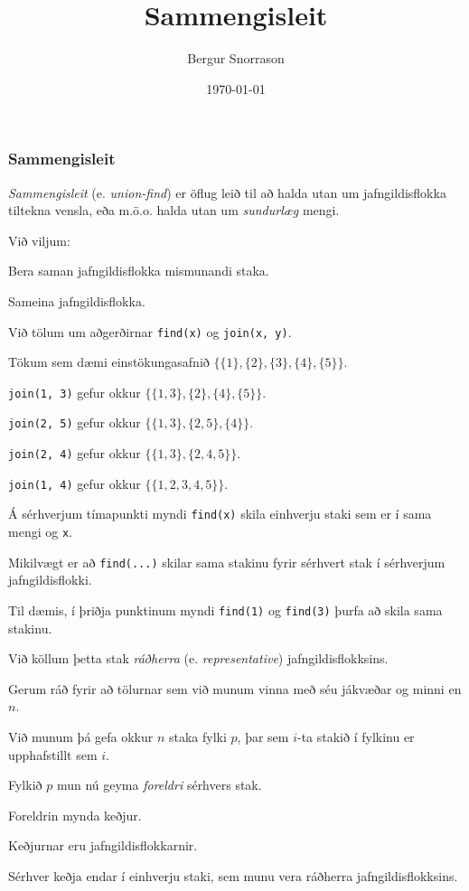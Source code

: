 \title{Sammengisleit}
\author{Bergur Snorrason}
\date{\today}



\frame{\titlepage}

{
	\frametitle{Sammengisleit}
	{
		\item<1-> \emph{Sammengisleit} (e. \emph{union-find}) er öflug leið til að halda utan um jafngildisflokka tiltekna vensla,
				eða m.ö.o. halda utan um \emph{sundurlæg} mengi.
		\item<2-> Við viljum:
		{
			\item<3-> Bera saman jafngildisflokka mismunandi staka.
			\item<4-> Sameina jafngildisflokka.
		}
		\item<5-> Við tölum um aðgerðirnar \texttt{find(x)} og \texttt{join(x, y)}.
	}
}

{
	{
		\item<1-> Tökum sem dæmi einstökungasafnið
			$\{\{1\}, \{2\}, \{3\}, \{4\}, \{5\}\}$. 
		\item<2-> \texttt{join(1, 3)} gefur okkur
			$\{\{1, 3\}, \{2\}, \{4\}, \{5\}\}$. 
		\item<3-> \texttt{join(2, 5)} gefur okkur
			$\{\{1, 3\}, \{2, 5\}, \{4\}\}$. 
		\item<4-> \texttt{join(2, 4)} gefur okkur
			$\{\{1, 3\}, \{2, 4, 5\}\}$. 
		\item<5-> \texttt{join(1, 4)} gefur okkur
			$\{\{1, 2, 3, 4, 5\}\}$. 
		\item<6-> Á sérhverjum tímapunkti myndi \texttt{find(x)} skila einhverju staki sem er í sama mengi og \texttt{x}.
		\item<7-> Mikilvægt er að \texttt{find(...)} skilar sama stakinu fyrir sérhvert stak í sérhverjum jafngildisflokki.
		\item<8-> Til dæmis, í þriðja punktinum myndi \texttt{find(1)} og \texttt{find(3)} þurfa að skila sama stakinu.
		\item<9-> Við köllum þetta stak \emph{ráðherra} (e. \emph{representative}) jafngildisflokksins.
	}
}

{
	{
		\item<1-> Gerum ráð fyrir að tölurnar sem við munum vinna með séu jákvæðar og minni en $n$.
		\item<2-> Við munum þá gefa okkur $n$ staka fylki $p$, þar sem $i$-ta stakið í fylkinu er upphafstillt sem $i$.
		\item<3-> Fylkið $p$ mun nú geyma \emph{foreldri} sérhvers stak.
		\item<4-> Foreldrin mynda keðjur.
		\item<5-> Keðjurnar eru jafngildisflokkarnir.
		\item<6-> Sérhver keðja endar í einhverju staki, sem munu vera ráðherra jafngildisflokksins.
	}
}

